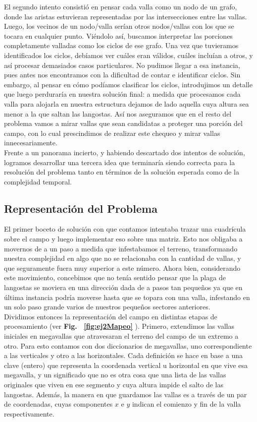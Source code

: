 \indent El segundo intento consistió en pensar cada valla como un nodo de un grafo, donde las aristas estuvieran representadas por las intersecciones entre las vallas. Luego, los vecinos de un nodo/valla serían otros nodos/vallas con los que se tocara en cualquier punto. Viéndolo así, buscamos interpretar las porciones completamente valladas como los ciclos de ese grafo. Una vez que tuvieramos identificados los ciclos, debíamos ver cuáles eran válidos, cuáles incluían a otros, y así procesar demasiados casos particulares. No pudimos llegar a esa instancia, pues antes nos encontramos con la dificultad de contar e identificar ciclos. Sin embargo, al pensar en cómo podíamos clasificar los ciclos, introdujimos un detalle que luego perduraría en nuestra solución final: a medida que procesamos cada valla para alojarla en nuestra estructura dejamos de lado aquella cuya altura sea menor a la que saltan las langostas. Así nos aseguramos que en el resto del problema vamos a mirar vallas que sean candidatas a proteger una porción del campo, con lo cual prescindimos de realizar este chequeo y mirar vallas innecesariamente.\\
\indent Frente a un panorama incierto, y habiendo descartado dos intentos de solución, logramos desarrollar una tercera idea que terminaría siendo correcta para la resolución del problema tanto en términos de la solución esperada como de la complejidad temporal. 

\subsection{Representación del Problema}

El primer boceto de solución con que contamos intentaba trazar una cuadrícula sobre el campo y luego implementar eso sobre una matriz. Esto nos obligaba a movernos de a un paso a medida que infestabamos el terreno, transformando nuestra complejidad en algo que no se relacionaba con la cantidad de vallas, y que seguramente fuera muy superior a este número. Ahora bien, considerando este movimiento, concebimos que no tenía sentido pensar que la plaga de langostas se moviera en una dirección dada de a pasos tan pequeños ya que en última instancia podría moverse hasta que se topara con una valla, infestando en un solo paso grande varios de nuestros pequeños sectores anteriores.\\
\indent Dividimos entonces la representación del campo en distintas etapas de procesamiento (ver \textbf{Fig. ~\ref{fig:ej2Mapeo} }). Primero, extendimos las vallas iniciales en megavallas que atravesaran el terreno del campo de un extremo a otro. Para esto contamos con dos diccionarios de megavallas, uno correspondiente a las verticales y otro a las horizontales. Cada definición se hace en base a una clave (entero) que representa la coordenada vertical u horizontal en que vive esa megavalla, y un significado que no es otra cosa que una lista de las vallas originales que viven en ese segmento y cuya altura impide el salto de las langostas. Además, la manera en que guardamos las vallas es a través de un par de coordenadas, cuyas componentes $x$ e $y$ indican el comienzo y fin de la valla respectivamente.

